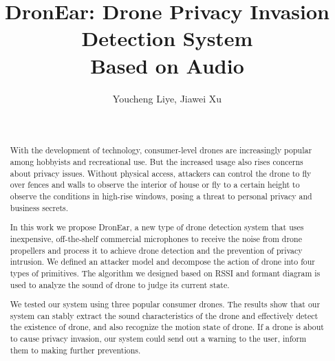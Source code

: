\documentclass{sig-alternate-10pt}
\begin{document}
\title{DronEar: Drone Privacy Invasion Detection System \\ Based on Audio}

%
\author{
Youcheng Liye, Jiawei Xu
\\
\and %
       \\
       }

\maketitle

\begin{abstract}

With the development of technology, consumer-level drones are increasingly popular among hobbyists and recreational use. But the increased usage also rises concerns about privacy issues. Without physical access, attackers can control the drone to fly over fences and walls to observe the interior of  house or fly to a certain height to observe the conditions in high-rise windows, posing a threat to personal privacy and business secrets. 

In this work we propose DronEar, a new type of drone detection system that uses inexpensive, off-the-shelf commercial microphones to receive the noise from drone propellers and process it to achieve drone detection and the prevention of privacy intrusion. We defined an attacker model and decompose the action of drone into four types of primitives. The algorithm we designed based on RSSI and formant diagram is used to analyze the sound of drone to judge its current state.

We tested our system using three popular consumer drones. The results show that our system can stably extract the sound characteristics of the drone and effectively detect the existence of drone, and also recognize the motion state of drone. If a drone is about to cause privacy invasion, our system could send out a warning to the user, inform them to making further preventions.


\end{abstract}
\end{document}
